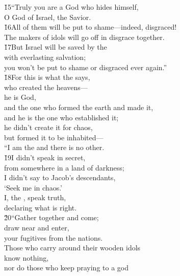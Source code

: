 \begin{poetry}
\poeml \v{15}``Truly you are a God who hides himself, \\
\poemll    O God of Israel, the Savior. \\
\poeml \v{16}All of them will be put to shame---indeed, disgraced! \\
\poemll    The makers of idols will go off in disgrace together. \\
\poeml \v{17}But Israel will be saved by the  \\
\poemll    with everlasting salvation; \\
\poeml you won't be put to shame or disgraced ever again.'' \\
\poeml \v{18}For this is what the  says, \\
\poemll    who created the heavens--- \\
\poeml he is God, \\
\poemll    and the one who formed the earth and made it, \\
\poeml and he is the one who established it; \\
\poemll    he didn't create it for chaos, \\
\poemlll       but formed it to be inhabited--- \\
\poeml ``I am the  and there is no other. \\
\poeml \v{19}I didn't speak in secret, \\
\poemlll       from somewhere in a land of darkness; \\
\poeml I didn't say to Jacob's descendants, \\
\poemll    `Seek me in chaos.' \\
\poeml I, the , speak truth, \\
\poemll    declaring what is right. \\
\poeml \v{20}``Gather together and come; \\
\poemll    draw near and enter, \\
\poemlll       your fugitives from the nations. \\
\poeml Those who carry around their wooden idols \\
\poemll    know nothing, \\
\poeml nor do those who keep praying to a god \\

\end{poetry}
